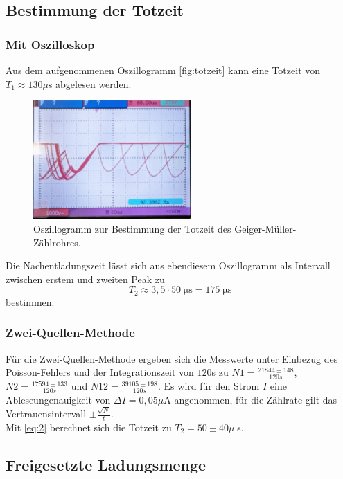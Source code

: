 \subsection{Bestimmung der Totzeit}
\subsubsection{Mit Oszilloskop}
Aus dem aufgenommenen Oszillogramm \autoref{fig:totzeit} kann eine Totzeit von 
$T_1 \approx 130 \mu$s abgelesen werden.\\
\begin{figure}[H]
  \centering
  \includegraphics[width = 6cm]{content/totzeit.jpg}
  \caption{Oszillogramm zur Bestimmung der Totzeit des Geiger-Müller-Zählrohres.}
  \label{fig:totzeit}
\end{figure}
Die Nachentladungszeit lässt sich aus ebendiesem Oszillogramm als Intervall zwischen erstem und zweiten Peak zu
\begin{equation*}
  T_2 \approx 3,5 \cdot 50 \; \mathrm{\mu s} = 175 \; \mathrm{\mu s}
\end{equation*}
bestimmen.\\

\subsubsection{Zwei-Quellen-Methode}
 Für die Zwei-Quellen-Methode ergeben sich die Messwerte unter Einbezug des 
 Poisson-Fehlers und der Integrationszeit von $120$s zu $N1 = \frac{21844 \pm 148}{120s}$, $N2 = \frac{17594 \pm 133}{120s}$ 
 und $N12 = \frac{39105 \pm 198}{120s}$.
 Es wird für den Strom $I$ eine Ableseungenauigkeit von $\Delta I = 0,05 \mu$A angenommen, für die Zählrate 
 gilt das Vertrauensintervall $\pm \frac{\sqrt{N}}{t}$.\\
 Mit \autoref{eq:2} berechnet sich die Totzeit zu $T_2 = 50 \pm 40 \mu \;$s.




\subsection{Freigesetzte Ladungsmenge}

